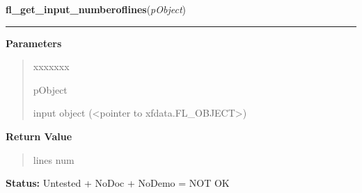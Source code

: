 \hspace{.8\funcindent}\begin{boxedminipage}{\funcwidth}

    \raggedright \textbf{fl\_get\_input\_numberoflines}(\textit{pObject})

    \vspace{-1.5ex}

    \rule{\textwidth}{0.5\fboxrule}
\setlength{\parskip}{2ex}
\setlength{\parskip}{1ex}
      \textbf{Parameters}
      \vspace{-1ex}

      \begin{quote}
        \begin{Ventry}{xxxxxxx}

          \item[pObject]

          input object ({\textless}pointer to 
          xfdata.FL\_OBJECT{\textgreater})

        \end{Ventry}

      \end{quote}

      \textbf{Return Value}
    \vspace{-1ex}

      \begin{quote}
      lines num

      \end{quote}

\textbf{Status:} Untested + NoDoc + NoDemo = NOT OK



    \end{boxedminipage}

    \label{xformslib:library:fl_get_input_format}

    \vspace{0.5ex}

